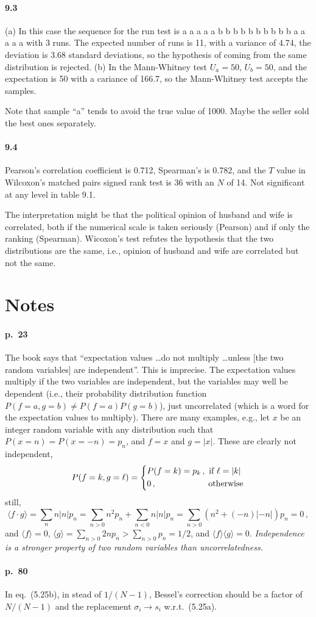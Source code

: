 \documentclass[a4paper,12pt]{article}
\begin{document}
\paragraph{9.3} (a) In this case the sequence for the run test is a a a a a b b b b b b b b b b a a a a a with 3 runs. The expected number of runs is  11, with a variance of 4.74, the deviation is 3.68 standard deviations, so the hypothesis of coming from the same distribution is rejected. (b) In the Mann-Whitney test $U_a=50$, $U_b=50$, and the expectation is 50 with a cariance of 166.7, so the Mann-Whitney test accepts the samples.

Note that sample ``a'' tends to avoid the true value of 1000. Maybe the seller sold the best ones separately.

\paragraph{9.4} Pearson's correlation coefficient is 0.712, Spearman's is 0.782, and the $T$ value in Wilcox\-on's matched pairs signed rank test is 36 with an $N$ of 14. Not significant at any level in table 9.1.

The interpretation might be that the political opinion of husband and wife is correlated, both if the numerical scale is taken seriously (Pearson) and if only the ranking (Spearman). Wicoxon's test refutes the hypothesis that the two distributions are the same, i.e., opinion of husband and wife are correlated but not the same. 


\section*{Notes}
\paragraph{p.\ 23} The book says that ``expectation values \dots do not multiply \dots unless [the two random variables] are independent''. This is imprecise. The expectation values multiply if the two variables are independent, but the variables may well be dependent (i.e., their probability distribution function $P(f=a, g=b) \ne P(f=a) P(g=b)$), just uncorrelated (which is a word for the expectation values to multiply). There are many examples, e.g., let $x$ be an integer random variable with any distribution such that $P(x=n) = P(x=-n) = p_n$, and $f=x$ and $g=|x|$. These are clearly not independent,
\[
 P(f=k, g=\ell) = \left\{
 \begin{aligned}
  &P(f=k) = p_k\,,\text{\ if } \ell=|k| \\
  &0\,,\hspace{5.8em}\text{\ otherwise}
 \end{aligned}
 \right.
\]
still,
\[
 \langle f\cdot g\rangle = \sum_{n} n |n| p_n = \sum_{n>0} n^2 p_n + \sum_{n<0} n|n| p_n = \sum_{n>0} (n^2 + (-n)|-n|) p_n = 0\,,
\]
and $\langle f\rangle = 0$, $\langle g \rangle =\sum_{n>0}2n p_n > \sum_{n>0} p_n = 1/2$, and $\langle f \rangle \langle g \rangle = 0$.
\emph{Independence is a stronger property of two random variables than uncorrelatedness.}


\paragraph{p.\ 80} In eq.\ (5.25b), in stead of $1/(N-1)$, Bessel's correction should be a factor of $N/(N-1)$ and the replacement $\sigma_i \to s_i$ w.r.t.\ (5.25a).
\end{document}
